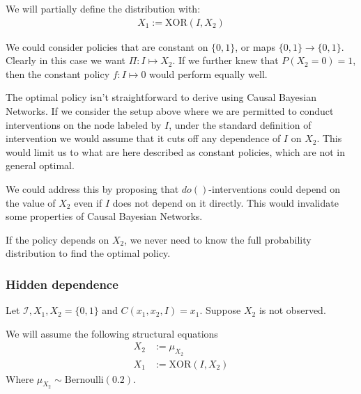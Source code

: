 We will partially define the distribution with:
\begin{align*}
    X_1 := \mathrm{XOR}(I,X_2)
\end{align*}

We could consider policies that are constant on $\{0,1\}$, or maps $\{0,1\}\to\{0,1\}$. Clearly in this case we want $\Pi:I\mapsto X_2$. If we further knew that $P(X_2=0)=1$, then the constant policy $f:I\mapsto 0$ would perform equally well.

\begin{remark}
The optimal policy isn't straightforward to derive using Causal Bayesian Networks. If we consider the setup above where we are permitted to conduct interventions on the node labeled by $I$, under the standard definition of intervention we would assume that it cuts off any dependence of $I$ on $X_2$. This would limit us to what are here described as constant policies, which are not in general optimal. 

We could address this by proposing that $do()$-interventions could depend on the value of $X_2$ even if $I$ does not depend on it directly. This would invalidate some properties of Causal Bayesian Networks.
\end{remark}

\begin{remark}
If the policy depends on $X_2$, we never need to know the full probability distribution to find the optimal policy.
\end{remark}

\subsubsection{Hidden dependence}
Let $\mathcal{I},X_1,X_2=\{0,1\}$ and $C(x_1,x_2,I)=x_1$. Suppose $X_2$ is not observed.

\begin{center}
\end{center}

We will assume the following structural equations
\begin{align*}
    X_2 &:= \mu_{X_2}\\
    X_1 &:= \mathrm{XOR}(I,X_2)
\end{align*}
Where $\mu_{X_2}\sim \mathrm{Bernoulli}(0.2)$.

